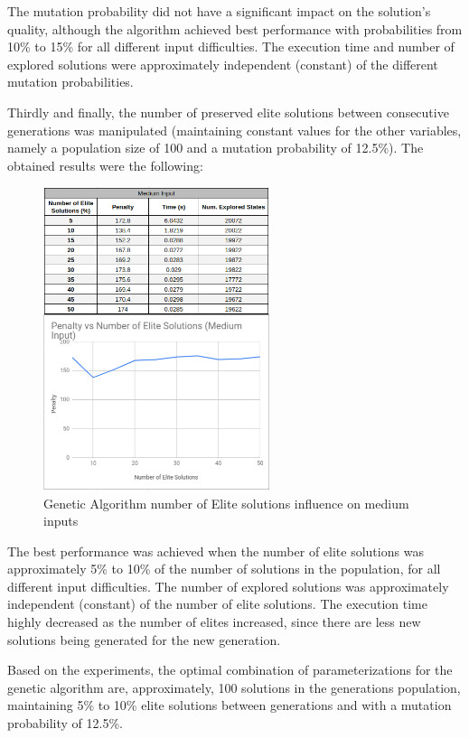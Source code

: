 \documentclass[conference]{IEEEtran}
\begin{document}
The mutation probability did not have a significant impact on the solution's quality, although the algorithm achieved best performance with probabilities from 10\% to 15\% for all different input difficulties. The execution time and number of explored solutions were approximately independent (constant) of the different mutation probabilities.

Thirdly and finally, the number of preserved elite solutions between consecutive generations was manipulated (maintaining constant values for the other variables, namely a population size of 100 and a mutation probability of 12.5\%). The obtained results were the following: 

\begin{figure}[H]
    \centerline{\includegraphics[width=250px]{elite_medium.png}}
    \caption{Genetic Algorithm number of Elite solutions influence on medium inputs}
\end{figure}

The best performance was achieved when the number of elite solutions was approximately 5\% to 10\% of the number of solutions in the population, for all different input difficulties. The number of explored solutions was approximately independent (constant) of the number of elite solutions. The execution time highly decreased as the number of elites increased, since there are less new solutions being generated for the new generation.

Based on the experiments, the optimal combination of parameterizations for the genetic algorithm are, approximately, 100 solutions in the generations population, maintaining 5\% to 10\% elite solutions between generations and with a mutation probability of 12.5\%.
\end{document}
